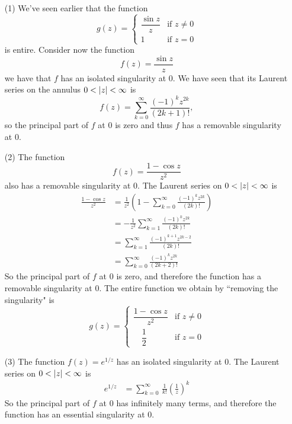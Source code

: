 \vspace*{1em}

\begin{example}\hfill
\begin{itemize}[itemsep=1em]
\item[(1)] We've seen earlier that the function
\[g(z) = \begin{cases}\dfrac{\sin z}{z} & \text{if } z \neq 0\\[1em] 1 & \text{if } z = 0 \end{cases}\] 
is entire. Consider now the function
\[f(z) = \frac{\sin z}{z}\]
we have that $f$ has an isolated singularity at $0$. We have seen that its Laurent series on the annulus $0 < \left\lvert z\right\rvert < \infty$ is
\[f(z) = \sum_{k=0}^\infty\frac{(-1)^kz^{2k}}{(2k + 1)!},\]
so the principal part of $f$ at $0$ is zero and thus $f$ has a removable singularity at $0$.

\item[(2)] The function
\[f(z) = \frac{1 - \cos z}{z^2}\]
also has a removable singularity at $0$. The Laurent series on $0 < \left\lvert z\right\rvert < \infty$ is
\begin{align*}
\frac{1 - \cos z}{z^2} &= \frac{1}{z^2}\left(1 - \sum_{k=0}^\infty \frac{(-1)^k z^{2k}}{(2k)!}\right)\\[0.5em]
 &= -\frac{1}{z^2}\sum_{k=1}^\infty \frac{(-1)^k z^{2k}}{(2k)!}\\[0.5em]
 &= \sum_{k=1}^\infty \frac{(-1)^{k+1} z^{2k - 2}}{(2k)!}\\[0.5em]
 &= \sum_{k=0}^\infty \frac{(-1)^{k} z^{2k}}{(2k+2)!}
\end{align*}
So the principal part of $f$ at $0$ is zero, and therefore the function has a removable singularity at $0$. The entire function we obtain by ``removing the singularity" is
\[g(z) = \begin{cases}\dfrac{1 - \cos z}{z^2} & \text{if } z \neq 0\\[1em] \quad\dfrac{1}{2} & \text{if } z = 0 \end{cases}\]

\item[(3)] The function $f(z) = e^{1/z}$ has an isolated singularity at $0$. The Laurent series on $0 < \left\lvert z\right\rvert < \infty$ is
\begin{align*}
e^{1/z} &= \sum_{k=0}^\infty\,\frac{1}{k!}\left(\frac{1}{z}\right)^k
\end{align*}
So the principal part of $f$ at $0$ has infinitely many terms, and therefore the function has an essential singularity at $0$.


\end{itemize}
\end{example}
